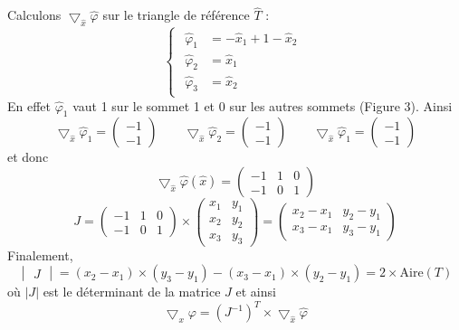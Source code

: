 \documentclass[a4paper,12pt,titlepage]{report}
\begin{document}
\begin{onehalfspace}
\begin{appendix}
Calculons $\bigtriangledown_{\hat{x}} \hat{\varphi}$ sur le triangle de référence $\hat{T}$ :
\[
\left\{
\begin{array}{ccc} 
	\begin{aligned}
		\hat{\varphi}_{1} &= -\hat{x}_{1}+1-\hat{x}_{2} \\  %
		\hat{\varphi}_{2} &= \hat{x}_{1}                \\  %
		\hat{\varphi}_{3} &= \hat{x}_{2}
	\end{aligned}
\end{array}
\right.
\]
En effet $\hat{\varphi}_{1}$ vaut 1 sur le sommet 1 et 0 sur les autres sommets (Figure 3).
Ainsi
\[ \bigtriangledown_{\hat{x}} \hat{\varphi}_{1} = 
\begin{pmatrix}
   -1 \\
   -1
\end{pmatrix}
\qquad
\bigtriangledown_{\hat{x}} \hat{\varphi}_{2} = 
\begin{pmatrix}
   -1 \\
   -1
\end{pmatrix}
\qquad
\bigtriangledown_{\hat{x}} \hat{\varphi}_{1} = 
\begin{pmatrix}
   -1 \\
   -1
\end{pmatrix}
\]
et donc
\[
\bigtriangledown_{\hat{x}} \hat{\varphi}(\hat{x}) = 
\begin{pmatrix}
   -1 & 1 & 0 \\
   -1 & 0 & 1 
\end{pmatrix}
\]
\[	
J =
\begin{pmatrix}
   -1 & 1 & 0 \\
   -1 & 0 & 1 
\end{pmatrix}
\times
\begin{pmatrix}
   x_{1} &  y_{1} \\
   x_{2} &  y_{2} \\
   x_{3} &  y_{3}
\end{pmatrix} =
\begin{pmatrix}
   x_{2}-x_{1} &  y_{2}-y_{1} \\
   x_{3}-x_{1} &  y_{3}-y_{1}
\end{pmatrix}
\]
Finalement,
\[
\begin{vmatrix}
   J
\end{vmatrix}
= (x_{2}-x_{1})\times (y_{3}-y_{1})-(x_{3}-x_{1})\times(y_{2}-y_{1})= 2\times\text{Aire}(T)
\]
où $|J|$ est le déterminant de la matrice $J$
et ainsi
\[ \bigtriangledown_{x} \varphi =  (J^{-1})^{T} \times \bigtriangledown_{\hat{x}} \hat{\varphi} \]

\end{appendix}
\end{onehalfspace}
\end{document}
